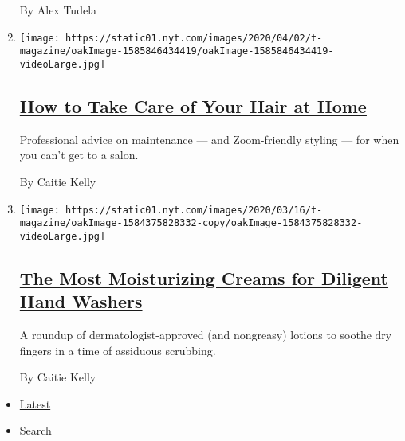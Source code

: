 \begin{enumerate}
  By Alex Tudela
\item
  \texttt{[image: https://static01.nyt.com/images/2020/04/02/t-magazine/oakImage-1585846434419/oakImage-1585846434419-videoLarge.jpg]}

  \hypertarget{how-to-take-care-of-your-hair-at-home}{%
  \subsection{\texorpdfstring{\href{/2020/04/02/t-magazine/home-hair-care-tips-coronavirus.html}{How
  to Take Care of Your Hair at
  Home}}{How to Take Care of Your Hair at Home}}\label{how-to-take-care-of-your-hair-at-home}}

  Professional advice on maintenance --- and Zoom-friendly styling ---
  for when you can't get to a salon.

  By Caitie Kelly
\item
  \texttt{[image: https://static01.nyt.com/images/2020/03/16/t-magazine/oakImage-1584375828332-copy/oakImage-1584375828332-videoLarge.jpg]}

  \hypertarget{the-most-moisturizing-creams-for-diligent-hand-washers}{%
  \subsection{\texorpdfstring{\href{/2020/03/18/t-magazine/best-moisturizing-creams-lotion.html}{The
  Most Moisturizing Creams for Diligent Hand
  Washers}}{The Most Moisturizing Creams for Diligent Hand Washers}}\label{the-most-moisturizing-creams-for-diligent-hand-washers}}

  A roundup of dermatologist-approved (and nongreasy) lotions to soothe
  dry fingers in a time of assiduous scrubbing.

  By Caitie Kelly
\end{enumerate}

\begin{itemize}
\tightlist
\item
  \protect\hyperlink{stream-panel}{Latest}
\item
  Search
\end{itemize}

